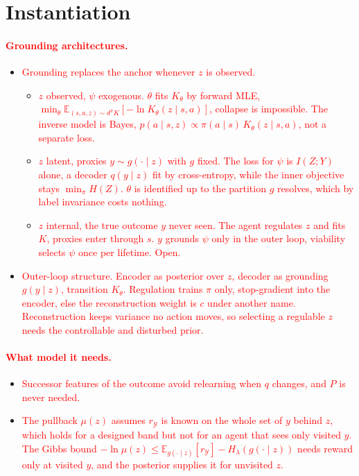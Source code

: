 \documentclass[10pt]{article}
\newcommand{\add}[1]{\textcolor{red}{#1}}
\begin{document}
\section{Instantiation}



\paragraph{\add{Grounding architectures.}}
\begin{itemize}
  \item \add{Grounding replaces the anchor whenever $z$ is observed.}
  \begin{itemize}
    \item \add{$z$ observed, $\psi$ exogenous. $\theta$ fits $K_\theta$ by forward MLE, $\min_\theta \mathbb E_{(s,a,z) \sim d^\pi K}[-\ln K_\theta(z \mid s,a)]$, collapse is impossible. The inverse model is Bayes, $p(a \mid s,z) \propto \pi(a \mid s)\,K_\theta(z \mid s,a)$, not a separate loss.}
    \item \add{$z$ latent, proxies $y \sim g(\cdot \mid z)$ with $g$ fixed. The loss for $\psi$ is $I(Z;Y)$ alone, a decoder $q(y \mid z)$ fit by cross-entropy, while the inner objective stays $\min_\pi H(Z)$. $\theta$ is identified up to the partition $g$ resolves, which by label invariance costs nothing.}
    \item \add{$z$ internal, the true outcome $y$ never seen. The agent regulates $z$ and fits $K$, proxies enter through $s$. $y$ grounds $\psi$ only in the outer loop, viability selects $\psi$ once per lifetime. Open.}
  \end{itemize}
  \item \add{Outer-loop structure. Encoder as posterior over $z$, decoder as grounding $g(y \mid z)$, transition $K_\theta$. Regulation trains $\pi$ only, stop-gradient into the encoder, else the reconstruction weight is $c$ under another name. Reconstruction keeps variance no action moves, so selecting a regulable $z$ needs the controllable and disturbed prior.}
\end{itemize}

\paragraph{\add{What model it needs.}}
\begin{itemize}
  \item \add{Successor features of the outcome avoid relearning when $q$ changes, and $P$ is never needed.}
  \item \add{The pullback $\mu(z)$ assumes $r_{\mathcal Y}$ is known on the whole set of $y$ behind $z$, which holds for a designed band but not for an agent that sees only visited $y$.
    The Gibbs bound $-\ln \mu(z) \le \mathbb E_{g(\cdot \mid z)}[r_{\mathcal Y}] - H_\lambda(g(\cdot \mid z))$ needs reward only at visited $y$, and the posterior supplies it for unvisited $z$.}
\end{itemize}
\end{document}
